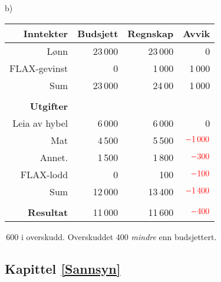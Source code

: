 b)\\
\begin{tabular}{r r r r}
	\textbf{Inntekter} & Budsjett & Regnskap & Avvik \\ \hline 
	Lønn & 23\,000 & 23\,000 & 0\\
	FLAX-gevinst & 0& 1\,000 & 1\,000\\ \hline
	Sum & 23\,000 & 24\,00 & 1\,000\\\hline 
	& \\
	\textbf{Utgifter} & \\ \hline
	Leia av hybel & 6\,000 & 6\,000 &0 \\
	Mat & 4\,500 & 5\,500 & $ \color{red}-1\,000 $\\
	Annet. & 1\,500 & 1\,800 & $ \color{red}-300 $\\ 
	FLAX-lodd & 0 & 100 & $ \color{red}-100 $ \\
	\hline
	Sum & 12\,000 & 13\,400 & $ \color{red}-1\,400 $\\ \hline
	& \\ \hline
	\textbf{Resultat} & 11\,000 & 11\,600 & $ \color{red}-400 $ \\ \hline
\end{tabular}\,600 i overskudd. Overskuddet 400 \textsl{mindre} enn budsjettert.


\subsection*{Kapittel \ref{Sannsyn}}








